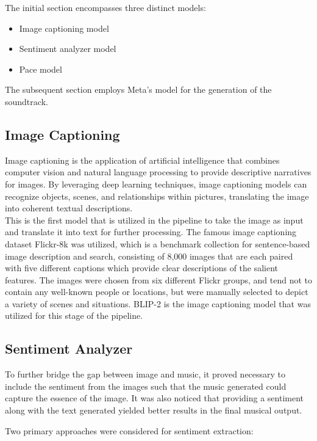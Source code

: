 \documentclass[conference]{IEEEtran}
\begin{document}
The initial section encompasses three distinct models:
\begin{itemize}
    \item Image captioning model
    \item Sentiment analyzer model
    \item Pace model
\end{itemize}

The subsequent section employs Meta's model for the generation of the soundtrack.

\subsection{Image Captioning}

Image captioning is the application of artificial intelligence that combines computer vision and natural language processing to provide descriptive narratives for images. By leveraging deep learning techniques, image captioning models can recognize objects, scenes, and relationships within pictures, translating the image into coherent textual descriptions.
\\

This is the first model that is utilized in the pipeline to take the image as input and translate it into text for further processing. The famous image captioning dataset Flickr-8k was utilized, which is a benchmark collection for sentence-based image description and search, consisting of 8,000 images that are each paired with five different captions which provide clear descriptions of the salient features. The images were chosen from six different Flickr groups, and tend not to contain any well-known people or locations, but were manually selected to depict a variety of scenes and situations. BLIP-2 is the image captioning model that was utilized for this stage of the pipeline.

\subsection{Sentiment Analyzer}

To further bridge the gap between image and music, it proved necessary to include the sentiment from the images such that the music generated could capture the essence of the image. It was also noticed that providing a sentiment along with the text generated yielded better results in the final musical output.

Two primary approaches were considered for sentiment extraction:
\end{document}
